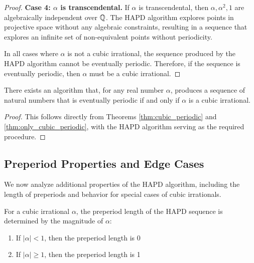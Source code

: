 \begin{proof}
\textbf{Case 4: $\alpha$ is transcendental.} If $\alpha$ is transcendental, then $\alpha, \alpha^2, 1$ are algebraically independent over $\mathbb{Q}$. The HAPD algorithm explores points in projective space without any algebraic constraints, resulting in a sequence that explores an infinite set of non-equivalent points without periodicity.

In all cases where $\alpha$ is not a cubic irrational, the sequence produced by the HAPD algorithm cannot be eventually periodic. Therefore, if the sequence is eventually periodic, then $\alpha$ must be a cubic irrational.
\end{proof}

\begin{theorem}\label{thm:main_result}
There exists an algorithm that, for any real number $\alpha$, produces a sequence of natural numbers that is eventually periodic if and only if $\alpha$ is a cubic irrational.
\end{theorem}

\begin{proof}
This follows directly from Theorems \ref{thm:cubic_periodic} and \ref{thm:only_cubic_periodic}, with the HAPD algorithm serving as the required procedure.
\end{proof}

\subsection{Preperiod Properties and Edge Cases}

We now analyze additional properties of the HAPD algorithm, including the length of preperiods and behavior for special cases of cubic irrationals.

\begin{theorem}\label{thm:preperiod}
For a cubic irrational $\alpha$, the preperiod length of the HAPD sequence is determined by the magnitude of $\alpha$:
\begin{enumerate}
    \item If $|\alpha| < 1$, then the preperiod length is 0
    \item If $|\alpha| \geq 1$, then the preperiod length is 1
\end{enumerate}
\end{theorem}

